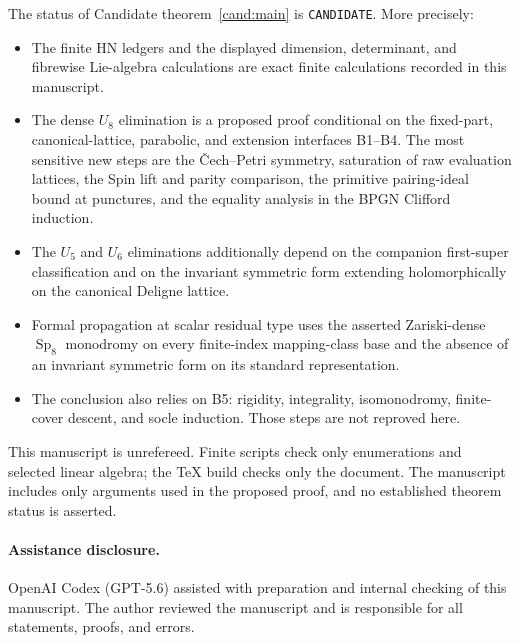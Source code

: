 \documentclass[11pt]{article}
\theoremstyle{definition}
\newcommand{\Sp}{\operatorname{Sp}}
\begin{document}
The status of Candidate theorem~\ref{cand:main} is \texttt{CANDIDATE}.  More precisely:
\begin{itemize}
\item The finite HN ledgers and the displayed dimension, determinant, and
fibrewise Lie-algebra calculations are exact finite calculations recorded in
this manuscript.
\item The dense $U_8$ elimination is a proposed proof conditional on the
fixed-part, canonical-lattice, parabolic, and extension interfaces B1--B4.
The most sensitive new steps are the \v{C}ech--Petri symmetry, saturation of
raw evaluation lattices, the Spin lift and parity comparison, the primitive
pairing-ideal bound at punctures, and the equality analysis in the BPGN
Clifford induction.
\item The $U_5$ and $U_6$ eliminations additionally depend on the companion
first-super classification and on the invariant symmetric form extending
holomorphically on the canonical Deligne lattice.
\item Formal propagation at scalar residual type uses the asserted
Zariski-dense $\Sp_8$ monodromy on every finite-index mapping-class base and
the absence of an invariant symmetric form on its standard representation.
\item The conclusion also relies on B5: rigidity, integrality,
isomonodromy, finite-cover descent, and socle induction.  Those steps are not
reproved here.
\end{itemize}

This manuscript is unrefereed.  Finite scripts check only enumerations and
selected linear algebra; the TeX build checks only the document.  The
manuscript includes only arguments used in the proposed proof, and no
established theorem status is asserted.

\paragraph{Assistance disclosure.}
OpenAI Codex (GPT-5.6) assisted with preparation and internal checking of this
manuscript.  The author reviewed the manuscript and is responsible for all
statements, proofs, and errors.
\end{document}

